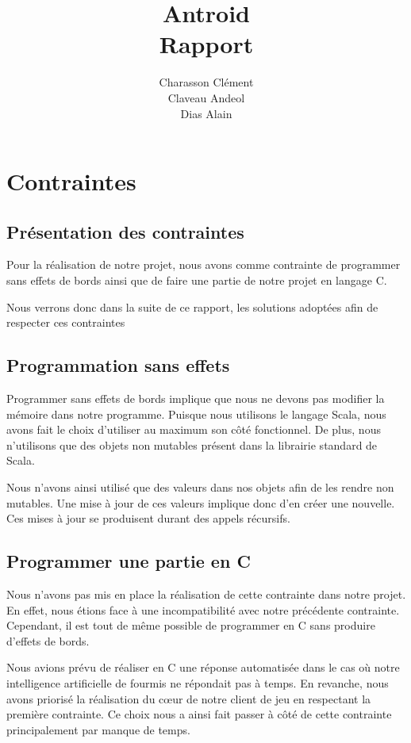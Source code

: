 \documentclass[12pt,a4paper]{report}
\title{\huge \textbf {Antroid \\Rapport}}
\author{Charasson Clément \\ Claveau Andeol \\ Dias Alain}
\begin{document}
\maketitle

\chapter{Contraintes}

\section{Présentation des contraintes}

Pour la réalisation de notre projet, nous avons comme contrainte de programmer sans effets de bords ainsi que de faire une partie de notre projet en langage C.\newline

Nous verrons donc dans la suite de ce rapport, les solutions adoptées afin de respecter ces contraintes

\section{Programmation sans effets}

Programmer sans effets de bords implique que nous ne devons pas modifier la mémoire dans notre programme. Puisque nous utilisons le langage Scala, nous avons fait le choix d'utiliser au maximum son côté fonctionnel. De plus, nous n'utilisons que des objets non mutables présent dans la librairie standard de Scala.\newline

Nous n'avons ainsi utilisé que des valeurs dans nos objets afin de les rendre non mutables. Une mise à jour de ces valeurs implique donc d'en créer une nouvelle. Ces mises à jour se produisent durant des appels récursifs.

\section{Programmer une partie en C}

Nous n'avons pas mis en place la réalisation de cette contrainte dans notre projet. En effet, nous étions face à une incompatibilité avec notre précédente contrainte. Cependant, il est tout de même possible de programmer en C sans produire d'effets de bords.\newline

Nous avions prévu de réaliser en C une réponse automatisée dans le cas où notre intelligence artificielle de fourmis ne répondait pas à temps. En revanche, nous avons priorisé la réalisation du cœur de notre client de jeu en respectant la première contrainte. Ce choix nous a ainsi fait passer à côté de cette contrainte principalement par manque de temps.
\end{document}
